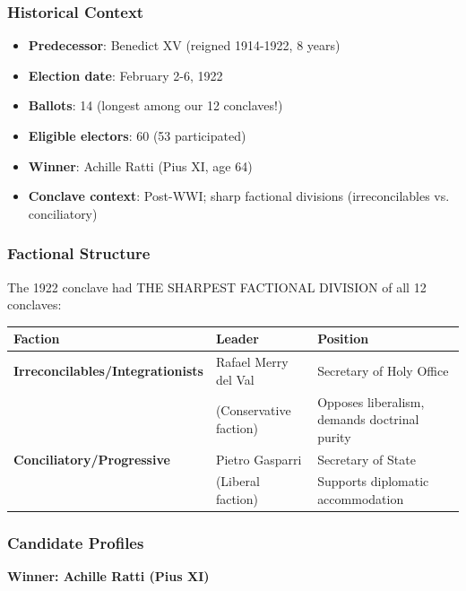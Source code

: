 \documentclass[11pt,a4paper]{article}
\begin{document}
\subsubsection{Historical Context}

\begin{itemize}
    \item \textbf{Predecessor}: Benedict XV (reigned 1914-1922, 8 years)
    \item \textbf{Election date}: February 2-6, 1922
    \item \textbf{Ballots}: 14 (longest among our 12 conclaves!)
    \item \textbf{Eligible electors}: 60 (53 participated)
    \item \textbf{Winner}: Achille Ratti (Pius XI, age 64)
    \item \textbf{Conclave context}: Post-WWI; sharp factional divisions (irreconcilables vs. conciliatory)
\end{itemize}

\subsubsection{Factional Structure}

The 1922 conclave had THE SHARPEST FACTIONAL DIVISION of all 12 conclaves:

\begin{center}
\begin{tabular}{lll}
\toprule
\textbf{Faction} & \textbf{Leader} & \textbf{Position} \\
\midrule
\textbf{Irreconcilables/Integrationists} & Rafael Merry del Val & Secretary of Holy Office \\
& (Conservative faction) & Opposes liberalism, demands doctrinal purity \\
\midrule
\textbf{Conciliatory/Progressive} & Pietro Gasparri & Secretary of State \\
& (Liberal faction) & Supports diplomatic accommodation \\
\bottomrule
\end{tabular}
\end{center}

\subsubsection{Candidate Profiles}

\textbf{Winner: Achille Ratti (Pius XI)}
\end{document}
